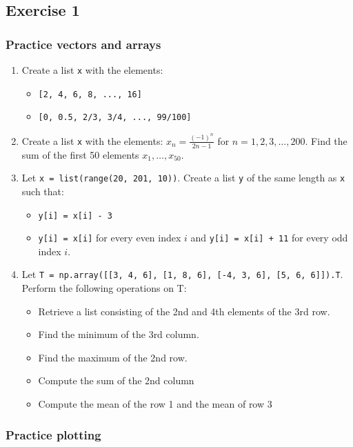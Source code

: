 \subsection*{Exercise 1}
\begin{frame}[fragile,label=practice_vectors_arrays]
  \frametitle{Practice vectors and arrays}
  \begin{enumerate}
    \item Create a list \lstinline|x| with the elements:
    \begin{itemize}
      \item \lstinline|[2, 4, 6, 8, ..., 16]|
      \item \lstinline|[0, 0.5, 2/3, 3/4, ..., 99/100]|
    \end{itemize}
    \item Create a list \lstinline|x| with the elements: \(x_n = \frac{(-1)^n}{2n-1}\) for \(n=1,2,3,\ldots,200\). Find the sum of the first 50 elements \(x_1,\ldots,x_{50}\).
    \item Let \lstinline|x = list(range(20, 201, 10))|. Create a list \lstinline|y| of the same length as \lstinline|x| such that:
    \begin{itemize}
      \item \lstinline|y[i] = x[i] - 3|
      \item \lstinline|y[i] = x[i]| for every even index \(i\) and \lstinline|y[i] = x[i] + 11| for every odd index \(i\).
    \end{itemize}
    \item Let \lstinline|T = np.array([[3, 4, 6], [1, 8, 6], [-4, 3, 6], [5, 6, 6]]).T|. Perform the following operations on T:
    \begin{itemize}
      \item Retrieve a list consisting of the 2nd and 4th elements of the 3rd row.
      \item Find the minimum of the 3rd column.
      \item Find the maximum of the 2nd row.
      \item Compute the sum of the 2nd column
      \item Compute the mean of the row 1 and the mean of row 3
    \end{itemize}
  \end{enumerate}
 \end{frame}


 \begin{frame}[fragile]
  \frametitle{Practice plotting}
 \end{frame}

